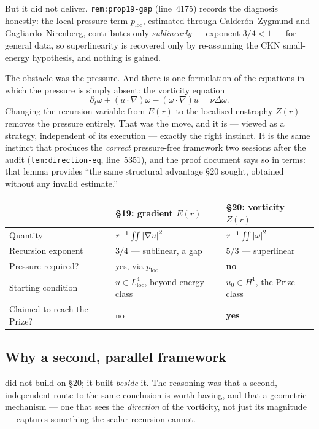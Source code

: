But it did not deliver. \texttt{rem:prop19-gap} (line~4175) records the
diagnosis honestly: the local pressure term \(p_{\mathrm{loc}}\), estimated
through Calder\'on--Zygmund and Gagliardo--Nirenberg, contributes only
\emph{sublinearly} --- exponent \(3/4<1\) --- for general data, so
superlinearity is recovered only by re-assuming the CKN small-energy
hypothesis, and nothing is gained.

The obstacle was the pressure. And there is one formulation of the equations
in which the pressure is simply absent: the vorticity equation
\[
  \partial_t\omega + (u\cdot\nabla)\omega - (\omega\cdot\nabla)u
    = \nu\Delta\omega .
\]
Changing the recursion variable from \(E(r)\) to the localised enstrophy
\(Z(r)\) removes the pressure entirely. That was the  move, and it is
--- viewed as a strategy, independent of its execution --- exactly the right
instinct. It is the same instinct that produces the \emph{correct} pressure-free
framework two sessions after the audit
(\texttt{lem:direction-eq}, line~5351), and the proof document says so in
terms: that lemma provides ``the same structural advantage \S20 sought,
obtained without any invalid estimate.''

\begin{center}
\small
\begin{tabular}{@{}l l l@{}}
\toprule
& \S19: gradient \(E(r)\) & \S20: vorticity \(Z(r)\) \\
\midrule
Quantity & \(r^{-1}\iint\left|\nabla u\right|^2\) & \(r^{-1}\iint\left|\omega\right|^2\) \\
Recursion exponent & \(3/4\) --- sublinear, a gap & \(5/3\) --- superlinear \\
Pressure required? & yes, via \(p_{\mathrm{loc}}\) & \textbf{no} \\
Starting condition & \(u\in L^4_{\mathrm{loc}}\), beyond energy class
  & \(u_0\in H^1\), the Prize class \\
Claimed to reach the Prize? & no & \textbf{yes} \\
\bottomrule
\end{tabular}
\end{center}

\subsection{Why a second, parallel framework}

 did not build on \S20; it built \emph{beside} it. The reasoning was
that a second, independent route to the same conclusion is worth having, and
that a geometric mechanism --- one that sees the \emph{direction} of the
vorticity, not just its magnitude --- captures something the scalar recursion
cannot.

